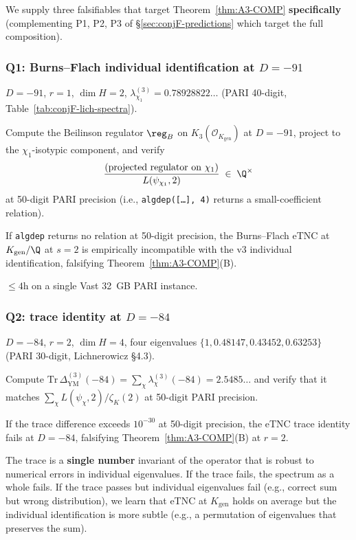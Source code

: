 We supply three falsifiables that target Theorem~\ref{thm:A3-COMP}
{\bf specifically} (complementing P1, P2, P3 of \S\ref{sec:conjF-predictions}
which target the full composition).

\subsubsection{Q1: Burns--Flach individual identification at $D = -91$}
\label{sec:conjF-A3-Q1}

  $D = -91$, $r = 1$, $\dim H = 2$,
$\lambda_{\chi_1}^{(3)} = 0.78928822\ldots$ (PARI 40-digit,
Table~\ref{tab:conjF-lich-spectra}).

  Compute the Beilinson regulator $\reg_B$ on
$K_3(\mathcal{O}_{K_{\mathrm{gen}}})$ at $D = -91$, project to the
$\chi_1$-isotypic component, and verify
\[
\frac{\text{(projected regulator on }\chi_1\text{)}}{L(\psi_{\chi_1}, 2)}
\;\in\; \Q^\times
\]
at 50-digit PARI precision (i.e., \texttt{algdep([\ldots], 4)} returns
a small-coefficient relation).

  If \texttt{algdep} returns no relation
at 50-digit precision, the Burns--Flach eTNC at $K_{\mathrm{gen}}/\Q$
at $s = 2$ is empirically incompatible with the v3 individual
identification, falsifying Theorem~\ref{thm:A3-COMP}(B).

  $\le 4$h on a single Vast 32~GB PARI instance.

\subsubsection{Q2: trace identity at $D = -84$}
\label{sec:conjF-A3-Q2}

  $D = -84$, $r = 2$, $\dim H = 4$, four
eigenvalues $\{1, 0.48147, 0.43452, 0.63253\}$ (PARI 30-digit,
Lichnerowicz \S 4.3).

  Compute $\mathrm{Tr}\,\Delta_{\mathrm{YM}}^{(3)}(-84)
= \sum_\chi \lambda_\chi^{(3)}(-84) = 2.5485\ldots$ and verify that it
matches $\sum_\chi L(\psi_\chi, 2)/\zeta_K(2)$ at 50-digit PARI
precision.

  If the trace difference exceeds
$10^{-30}$ at 50-digit precision, the eTNC trace identity fails at
$D = -84$, falsifying Theorem~\ref{thm:A3-COMP}(B) at $r = 2$.

  The trace is a {\bf single number}
invariant of the operator that is robust to numerical errors in
individual eigenvalues.  If the trace fails, the spectrum as a whole
fails.  If the trace passes but individual eigenvalues fail (e.g.,
correct sum but wrong distribution), we learn that eTNC at
$K_{\mathrm{gen}}$ holds on average but the individual identification
is more subtle (e.g., a permutation of eigenvalues that preserves the
sum).

